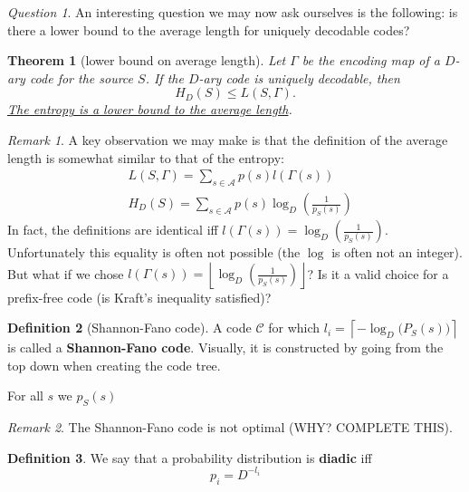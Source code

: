 \documentclass{report}
\theoremstyle{plain}
\newtheorem{thm}{Theorem}
\theoremstyle{definition}
\newtheorem{defn}[thm]{Definition}
\theoremstyle{remark}
\newtheorem*{remark}{Remark}
\newtheorem*{question}{Question}
\begin{document}
\begin{question}
An interesting question we may now ask ourselves is the following: is there a lower bound to the average length for uniquely decodable codes?
\end{question}

\begin{thm}[lower bound on average length]
	Let $\Gamma$ be the encoding map of a $D$-ary code for the source $S$. If the $D$-ary code is uniquely decodable, then
	\begin{equation}
		H_D(S) \leq L(S, \Gamma).
	\end{equation}
	\ul{The entropy is a lower bound to the average length}.
\end{thm}

\begin{remark}
	A key observation we may make is that the definition of the average length is somewhat similar to that of the entropy:
	\begin{align*}
		&L(S, \Gamma) = \sum_{s \in \mathcal A} p(s) l(\Gamma(s)) \\
		&H_D(S) = \sum_{s \in \mathcal A} p(s) \log_D \left(\frac{1}{p_S(s)}\right)
	\end{align*}
In fact, the definitions are identical iff $l(\Gamma(s)) = \log_D \left(\frac{1}{p_S(s)}\right)$. Unfortunately this equality is often not possible (the $\log$ is often not an integer). But what if we chose $l(\Gamma(s)) = \left\lfloor \log_D \left(\frac{1}{p_S(s)}\right) \right\rfloor$? Is it a valid choice for a prefix-free code (is Kraft's inequality satisfied)?
\end{remark}

\begin{defn}[Shannon-Fano code]
	A code $\mathcal C$ for which $l_i = \left\lceil -\log_D \bigl(P_S(s) \bigr) \right\rceil$ is called a \textbf{Shannon-Fano code}. Visually, it is constructed by going from the top down when creating the code tree.
\end{defn}

For all $s$ we $p_S(s)$
\begin{remark}
	The Shannon-Fano code is not optimal (WHY? COMPLETE THIS).
\end{remark}


\begin{defn}
	We say that a probability distribution is \textbf{diadic} iff
	\begin{equation}
		p_i = D^{-l_i}
	\end{equation}
\end{defn}
\end{document}

